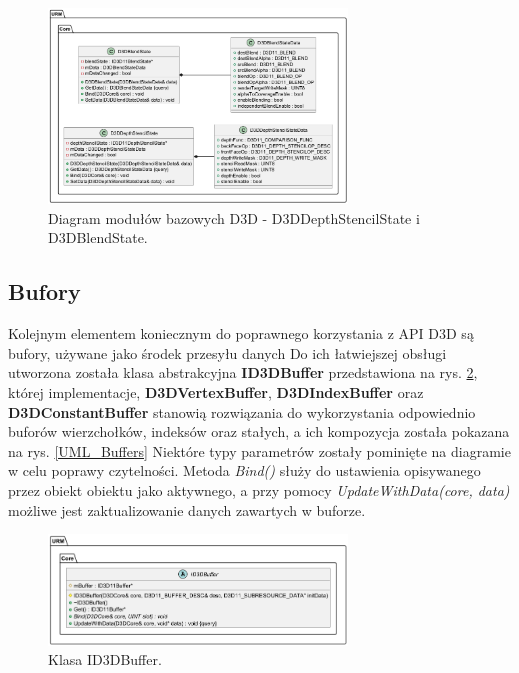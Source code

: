 	\begin{figure}[h!]
		\centering
		\includegraphics[width=300px]{images/UML/d3dutils_2.png}
		\caption{Diagram modułów bazowych D3D - D3DDepthStencilState i D3DBlendState.}
		\label{UML_D3DUtils_2}
	\end{figure}
	
	\vfill
	\clearpage
	
\subsection{Bufory}
	Kolejnym elementem koniecznym do poprawnego korzystania z API D3D są bufory, używane jako środek przesyłu danych 
	Do ich łatwiejszej obsługi utworzona została klasa abstrakcyjna \textbf{ID3DBuffer} przedstawiona na rys. \ref{UML_Buffer}, której implementacje, \textbf{D3DVertexBuffer}, \textbf{D3DIndexBuffer} oraz \textbf{D3DConstantBuffer} stanowią rozwiązania do wykorzystania odpowiednio buforów wierzchołków, indeksów oraz stałych, a ich kompozycja została pokazana na rys. \ref{UML_Buffers}
	Niektóre typy parametrów zostały pominięte na diagramie w celu poprawy czytelności.
	Metoda \textit{Bind()} służy do ustawienia opisywanego przez obiekt obiektu jako aktywnego, a przy pomocy \textit{UpdateWithData(core, data)} możliwe jest zaktualizowanie danych zawartych w buforze.
		
	\begin{figure}[h!]
		\centering
		\includegraphics[width=300px]{images/UML/buffer.png}
		\caption{Klasa ID3DBuffer.}
		\label{UML_Buffer}
	\end{figure}
	
